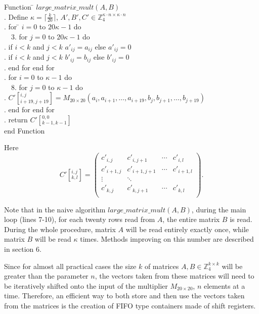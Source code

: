 \documentclass[11pt,twoside]{article}
\begin{document}
\begin{tabbing}
Function \= $large\_matrix\_mult(A,B)$ \\
. Define $\kappa=\lceil \frac{k}{20} \rceil$, $A',B',C' \in \mathbb{Z}_{4}^{\kappa \cdot n \times \kappa \cdot n}$ \\
. for \= $i=0$ to $20\kappa -1$ do \\
\> \ \ 3. for $j=0$ to $20\kappa -1$ do \\
\> . if $i<k$ and $j<k$ $a'_{ij}=a_{ij}$ else $a'_{ij}=0$ \\
\> . if $i<k$ and $j<k$ $b'_{ij}=b_{ij}$ else $b'_{ij}=0$ \\
. end for end for \\
. for $i=0$ to $\kappa -1$ do\\
\> \ \ 8. for $j=0$ to $\kappa -1$ do \\
\> . $C'[_{i+19,j+19}^{i,j}]=M_{20 \times 20}(a_{i},a_{i+1},\ldots,a_{i+19},b_{j},b_{j+1},\ldots,b_{j+19})$ \\
. end for end for \\
. return $C'[_{k-1,k-1}^{0,0}]$ \\
end Function \\
\end{tabbing}

Here
\[
C'[_{k,l}^{i,j}]=
\left(
\begin{matrix}
c'_{i,j} & c'_{i,j+1} & \cdots & c'_{i,l} \\
c'_{i+1,j} & c'_{i+1,j+1} & \cdots & c'_{i+1,l} \\
\vdots & \ddots \\
c'_{k,j} & c'_{k,j+1} & \cdots & c'_{k,l} \\
\end{matrix}
\right).
\]

Note that in the naive algorithm $large\_matrix\_mult(A,B)$, during the main loop (lines 7-10), for each twenty rows read from $A$, the entire matrix $B$ is read. During the whole procedure, matrix $A$ will be read entirely exactly once, while matrix $B$ will be read $\kappa$ times. Methods improving on this number are described in section 6.

Since for almost all practical cases the size $k$ of matrices $A,B\in \mathbb{Z}_{4}^{k \times k}$ will be greater than the parameter $n$, the vectors taken from these matrices will need to be iteratively shifted onto the input of the multiplier $M_{20 \times 20}$, $n$ elements at a time. Therefore, an efficient way to both store and then use the vectors taken from the matrices is the creation of FIFO type containers made of shift registers.
\end{document}
